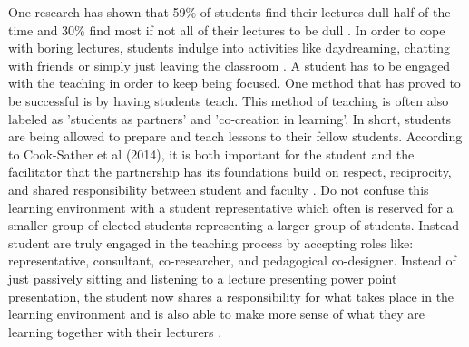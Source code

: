 \documentclass[12pt]{article}
\begin{document}
One research has shown that 59\% of students find their lectures dull half of the time and 30\% find most if not all of their lectures to be dull \cite{boredom-among-students}. In order to cope with boring lectures, students indulge into activities like daydreaming, chatting with friends or simply just leaving the classroom \cite{predictors-of-boredom}. A student has to be engaged with the teaching in order to keep being focused. One method that has proved to be successful is by having students teach. This method of teaching is often also labeled as 'students as partners' and 'co-creation in learning'. In short, students are being allowed to prepare and teach lessons to their fellow students. According to Cook-Sather et al (2014), it is both important for the student and the facilitator that the partnership has its foundations build on respect, reciprocity, and shared responsibility between student and faculty \cite{engaging-students}. Do not confuse this learning environment with a student representative which often is reserved for a smaller group of elected students representing a larger group of students. Instead student are truly engaged in the teaching process by accepting roles like: representative, consultant, co-researcher, and pedagogical co-designer. Instead of just passively sitting and listening to a lecture presenting power point presentation, the student now shares a responsibility for what takes place in the learning environment and is also able to make more sense of what they are learning together with their lecturers \cite{cocreation-in-learning}. 




\newpage



\end{document}
